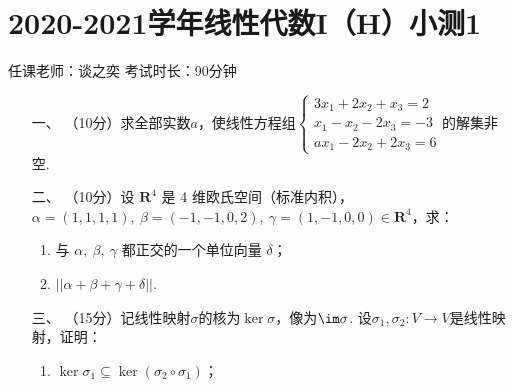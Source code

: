 \section*{2020-2021学年线性代数I（H）小测1}

\begin{center}
    任课老师：谈之奕\hspace{4em} 考试时长：90分钟
\end{center}

\begin{enumerate}
	\item[一、]（10分）求全部实数$a$，使线性方程组$\begin{cases}
        3x_1+2x_2+x_3=2 \\ x_1-x_2-2x_3=-3 \\ ax_1-2x_2+2x_3=6
    \end{cases}$的解集非空.
	\item[二、]（10分）设 $\mathbf{R}^4$ 是 4 维欧氏空间（标准内积），$\alpha=(1,1,1,1),\ \beta=(-1,-1,0,2),\ \gamma=(1,-1,0,0) \in \mathbf{R}^4$，求：
    \begin{enumerate}[label=(\arabic*)]
        \item 与 $\alpha,\ \beta,\ \gamma$ 都正交的一个单位向量 $\delta$；

        \item $||\alpha+\beta+\gamma+\delta||$.
    \end{enumerate}
	\item[三、]（15分）记线性映射$\sigma$的核为$\ker\sigma$，像为$\im\sigma$. 设$\sigma_1,\sigma_2:V\to V$是线性映射，证明：
	\begin{enumerate}[label=(\arabic*)]
        \item $\ker\sigma_1\subseteq\ker(\sigma_2\circ\sigma_1)$；


\end{enumerate}
\end{enumerate}
